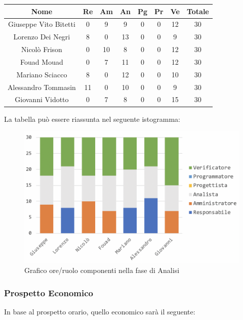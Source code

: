 			\begin{longtable}{|c|c|c|c|c|c|c|c}
				\hline
				\rowcolor{lighter-grayer}
				\textbf{Nome} & \textbf{Re} & \textbf{Am} & \textbf{An} & \textbf{Pg}  & \textbf{Pr}   & \textbf{Ve} & \textbf{Totale} \\
				\hline
				\endfirsthead
				
				\hline
				Giuseppe Vito Bitetti & 0 & 9 & 9 & 0 & 0 & 12 & 30\\
				\hline
				\hline
				Lorenzo Dei Negri & 8 & 0 & 13 & 0 & 0 & 9 & 30\\
				\hline
				\hline
				Nicolò Frison & 0 & 10 & 8 & 0 & 0 & 12 & 30\\
				\hline
				\hline
				Fouad Mouad & 0 & 7 & 11 & 0 & 0 & 12 & 30\\
				\hline
				\hline
				Mariano Sciacco & 8 & 0 & 12 & 0 & 0 & 10 & 30\\
				\hline
				\hline
				Alessandro Tommasin & 11 & 0 & 10 & 0 & 0 & 9 & 30\\
				\hline
				\hline
				Giovanni Vidotto & 0 & 7 & 8 & 0 & 0 & 15 & 30\\
				\hline 

			\end{longtable}
			\pagebreak
		
			La tabella può essere riassunta nel seguente istogramma:
		
			\begin{figure}[H]
				\centering
				\includegraphics[width=0.8\linewidth]{./images/analisi1.png}
				\caption{Grafico ore/ruolo componenti nella fase di Analisi}
				\label{fig:grafico suddivione ruoli fase Analisi}
			\end{figure}
		
			\subsubsection{Prospetto Economico}
			In base al prospetto orario, quello economico sarà il seguente: 
			
